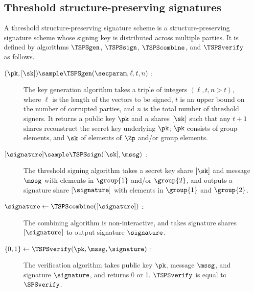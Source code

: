 \subsection{Threshold structure-preserving signatures}

A threshold structure-preserving signature scheme is a structure-preserving
signature scheme whose signing key is distributed across multiple parties. It
is defined by algorithms $\TSPSgen$, $\TSPSsign$, $\TSPScombine$, and
$\TSPSverify$ as follows.

\begin{description}

  \item[$(\pk, \lbrack \sk\rbrack ) \sample \TSPSgen(\secparam, \ell, t, n)$ :] The key
    generation algorithm takes a triple of integers $(\ell, t, n > t)$, where $\ell$
    is the length of the vectors to be signed, $t$ is an upper bound on the
    number of corrupted parties, and $n$ is the total number of threshold
    signers. It returns a public key $\pk$ and $n$ shares $\lbrack \sk\rbrack $
    such that any $t+1$ shares reconstruct the secret key underlying $\pk$;
    $\pk$ consists of group elements, and $\sk$ of elements of $\Zp$ and/or
    group elements.

  \item[$\lbrack \signature\rbrack  \sample \TSPSsign(\lbrack \sk\rbrack ,
    \mssg)$ :] The threshold signing algorithm takes a secret key share
    $\lbrack \sk\rbrack $ and message $\mssg$ with elements in
    $\group{1}$ and/or $\group{2}$, and outputs a signature share $\lbrack
    \signature\rbrack $ with elements in $\group{1}$ and $\group{2}$.

  \item[$\signature \leftarrow \TSPScombine(\lbrack \signature\rbrack )$ :] The
    combining algorithm is non-interactive, and takes signature shares $\lbrack
    \signature\rbrack $ to output signature $\signature$.

  \item[$\{0,1\} \leftarrow \TSPSverify(\pk, \mssg, \signature)$ :] The
    verification algorithm takes public key $\pk$, message $\mssg$,
    and signature $\signature$, and returns 0 or 1. $\TSPSverify$ is equal to
    $\SPSverify$.

\end{description}

